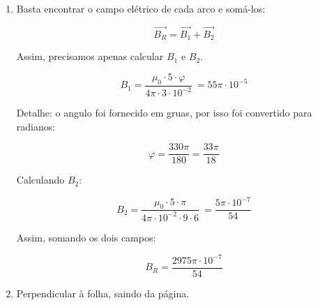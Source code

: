 \item
\begin{enumerate}
\item
Basta encontrar o campo elétrico de
cada arco e somá-los:

$$
\vec{B_R} = \vec{B_1} + \vec{B_2}
$$

Assim, precisamos apenas calcular $B_1$ e $B_2$.

$$
B_1 = \frac{\mu_0 \cdot 5 \cdot \varphi}{4 \pi \cdot 3 \cdot 10^{-2}}\
= 55 \pi \cdot 10^{-5}
$$

Detalhe: o angulo foi fornecido em gruas, por isso
foi convertido para radianos:

$$
\varphi = \frac{330 \pi}{180} = \frac{33 \pi}{18}
$$

Calculando $B_2$:

$$
B_2 = \frac{\mu_0 \cdot 5 \cdot \pi}{4 \pi \cdot 10^{-2} \cdot 9 \cdot 6}\
= \frac{5 \pi \cdot 10^{-7}}{54}
$$

Assim, somando os dois campos:

$$
B_R = \frac{2975 \pi \cdot 10^{-7}}{54}
$$

\item Perpendicular à folha, saindo da página.
\end{enumerate}
